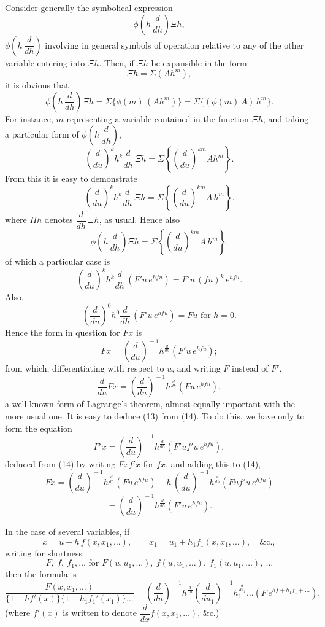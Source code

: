 \documentclass[11pt]{article}
\begin{document}
Consider generally the symbolical expression
\[
\phi\!\left(h\,\frac{d}{dh}\right)\Xi h \tag{4},
\]
$\phi\!\left(h\,\dfrac{d}{dh}\right)$ involving in general symbols of operation relative to any of the other variable entering into $\Xi h$. Then, if $\Xi h$ be expansible in the form
\[
\Xi h = \Sigma(A h^m) \tag{5},
\]
it is obvious that
\[
\phi\!\left(h\,\frac{d}{dh}\right)\Xi h = \Sigma\{\phi(m)\,(A h^m)\} = \Sigma\{(\phi(m)\,A)\,h^m\} \tag{6}.
\]
For instance, $m$ representing a variable contained in the function $\Xi h$, and taking a particular form of $\phi\!\left(h\,\dfrac{d}{dh}\right)$,
\[
\left(\frac{d}{du}\right)^k h^k\!\!\frac{d}{dh}\,\Xi h = \Sigma\!\left\{\left(\frac{d}{du}\right)^{k m} A h^m\right\} \tag{7}.
\]
From this it is easy to demonstrate
\[
\left(\frac{d}{du}\right)^k h^k\!\!\frac{d}{dh}\,\Xi h = \Sigma\!\left\{\left(\frac{d}{du}\right)^{k m}\!\! A\,h^m\right\} \tag{8}.
\]
where $\Pi h$ denotes $\dfrac{d}{dh}\,\Xi h$, as usual. Hence also
\[
\phi\!\left(h\,\frac{d}{dh}\right)\!\Xi h = \Sigma\!\left\{\!\left(\frac{d}{du}\right)^{k m}\!\! A\,h^m\right\} \tag{10}.
\]
of which a particular case is
\[
\left(\frac{d}{du}\right)^k h^k\!\!\frac{d}{dh}\,(F'u\,e^{h f u}) = F'u\,(f u)^k\,e^{h f u} \tag{11}.
\]
Also,
\[
\left(\frac{d}{du}\right)^0 h^0\!\!\frac{d}{dh}\,(F'u\,e^{h f u}) = F u \text{ for } h = 0 \tag{12}.
\]
Hence the form in question for $Fx$ is
\[
Fx = \left(\frac{d}{du}\right)^{\!\!-1} h^{\frac{d}{dh}}\!\!\left(F'u\,e^{h f u}\right) \tag{13};
\]
from which, differentiating with respect to $u$, and writing $F$ instead of $F'$,
\[
\frac{d}{du}Fx = \left(\frac{d}{du}\right)^{\!\!-1} h^{\frac{d}{dh}}\!\!\left(F u\,e^{h f u}\right) \tag{14},
\]
a well-known form of Lagrange's theorem, almost equally important with the more usual one. It is easy to deduce (13) from (14). To do this, we have only to form the equation
\[
F'x = \left(\frac{d}{du}\right)^{\!\!-1} h^{\frac{d}{dh}}\!\!\left(F'u f' u\,e^{h f u}\right) \tag{15},
\]
deduced from (14) by writing $Fx f'x$ for $fx$, and adding this to (14),
\[
Fx = \left(\frac{d}{du}\right)^{\!\!-1} h^{\frac{d}{dh}}\!\!\left(F u\,e^{h f u}\right) - h\,\left(\frac{d}{du}\right)^{\!\!-1} h^{\frac{d}{dh}}\!\!\left(F u f' u\,e^{h f u}\right)
\]
\[
= \left(\frac{d}{du}\right)^{\!\!-1} h^{\frac{d}{dh}}\!\!\left(F' u\,e^{h f u}\right) \tag{16}.
\]

In the case of several variables, if
\[
x = u + h\,f(x, x_1, \ldots), \qquad x_1 = u_1 + h_1 f_1(x, x_1, \ldots), \quad \&\text{c.} \tag{17},
\]
writing for shortness
\[
F,\ f,\ f_1, \ldots \text{ for } F(u, u_1, \ldots),\ f(u, u_1, \ldots),\ f_1(u, u_1, \ldots),\ \ldots
\]
then the formula is
\[
\frac{F(x, x_1, \ldots)}{\{1 - h f'(x)\}\{1 - h_1 f_1'(x_1)\} \ldots} = \left(\frac{d}{du}\right)^{\!\!-1} h^{\frac{d}{dh}} \left(\frac{d}{du_1}\right)^{\!\!-1} h_1^{\frac{d}{dh_1}}\!\!\ldots (F\,e^{h f + h_1 f_1 + \ldots}) \tag{18},
\]
(where $f'(x)$ is written to denote $\dfrac{d}{dx} f(x, x_1, \ldots)$, \&c.)
\end{document}
